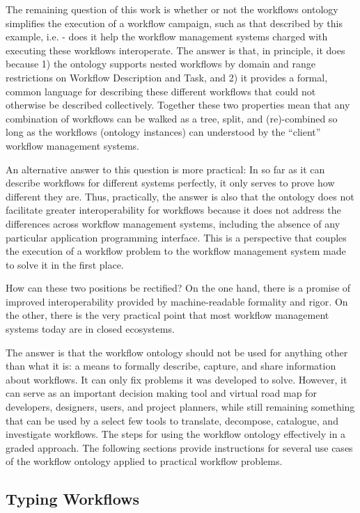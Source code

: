 The remaining question of this work is whether or not the workflows ontology
simplifies the execution of a workflow campaign, such as that described by
this example, i.e. - does it help the workflow management systems charged with
executing these workflows interoperate. The answer is that, in principle, it
does because 1) the ontology supports nested workflows by domain and range
restrictions on Workflow Description and Task, and 2) it provides a formal,
common language for describing these different workflows that could not
otherwise be described collectively. Together these two properties mean that
any combination of workflows can be walked as a tree, split, and (re)-combined
so long as the workflows (ontology instances) can understood by the ``client''
workflow management systems.

An alternative answer to this question is more practical: In so far as it can
describe workflows for different systems perfectly, it only serves to prove
how different they are. Thus, practically, the answer is also that the ontology
does not facilitate greater interoperability for workflows because it does not
address the differences across workflow management systems, including the
absence of any particular application programming interface. This is a
perspective that couples the execution of a workflow problem to the workflow
management system made to solve it in the first place.

How can these two positions be rectified? On the one hand, there is a promise of
improved interoperability provided by machine-readable formality and rigor. On
the other, there is the very practical point that most workflow management
systems today are in closed ecosystems.

The answer is that the workflow ontology should not be used for anything other
than what it is: a means to formally describe, capture, and share information
about workflows. It can only fix problems it was developed to solve. However, it
can serve as an important decision making tool and virtual road map for
developers, designers, users, and project planners, while still remaining
something that can be used by a select few tools to translate, decompose,
catalogue, and investigate workflows. The steps for using the workflow ontology
effectively in a graded approach. The following sections provide instructions
for several use cases of the workflow ontology applied to practical workflow
problems.

\subsection{Typing Workflows}

